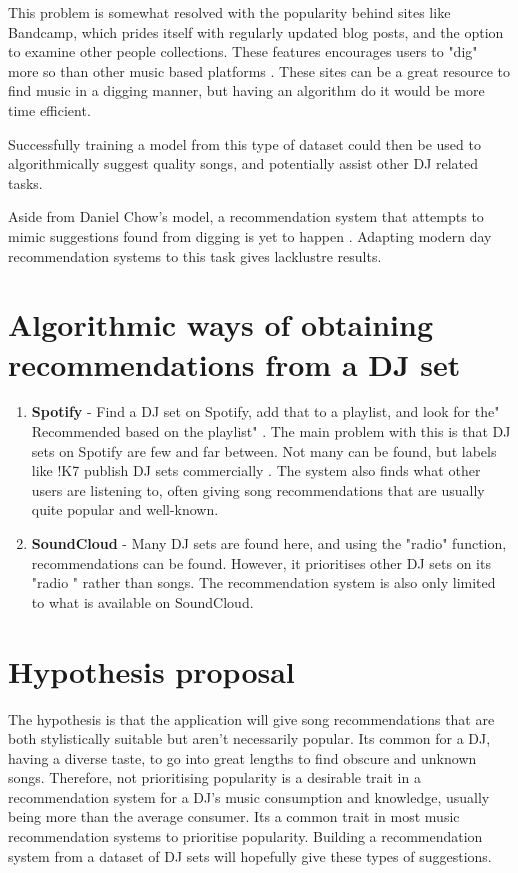 This problem is somewhat resolved with the popularity behind sites like Bandcamp, which prides itself with regularly updated blog posts, and the option to examine other people collections. These features encourages users to "dig" more so than other music based platforms \citep{bandcamp_about_2023}.  These sites can be a great resource to find music in a digging manner, but having an algorithm do it would be more time efficient. 

Successfully training a model from this type of dataset could then be used to algorithmically suggest quality songs, and potentially assist other DJ related tasks.

Aside from Daniel Chow's model, a recommendation system that attempts to mimic suggestions found from digging is yet to happen \citep{chow_music_2020}. Adapting modern day recommendation systems to this task gives lacklustre results.

\section{Algorithmic ways of obtaining recommendations from a DJ set}
\begin{enumerate}
	\item \textbf{Spotify }- Find a DJ set on Spotify, add that to a playlist, and look for the"
	Recommended based on the playlist" . The main problem with this is that DJ sets on Spotify are few and far between. Not many can be found, but labels like !K7 publish DJ sets commercially \citep{k7_about_2023}. The system also finds what other users are listening to, often giving song recommendations that are usually quite popular and well-known.
	
	\item \textbf{SoundCloud }- Many DJ sets are found here, and using the "radio" function, recommendations can be found. However, it prioritises other DJ sets on its "radio " rather than songs. The recommendation system is also only limited to what is available on SoundCloud.
	
\end{enumerate}

\section{Hypothesis proposal}
	
The hypothesis is that the application will give song recommendations that are both stylistically suitable but aren’t necessarily popular. Its common for a DJ, having a diverse taste, to go into
great lengths to find obscure and unknown songs. Therefore, not prioritising popularity is a
desirable trait in a recommendation system for a DJ’s music consumption and knowledge, usually
being more than the average consumer. Its a common trait in most music recommendation
systems to prioritise popularity. Building a recommendation system from a dataset of DJ sets
will hopefully give these types of suggestions.	

